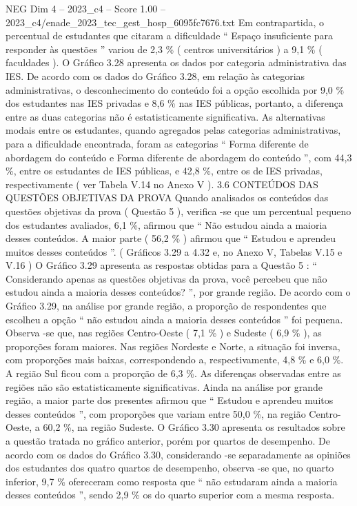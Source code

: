 \begin{textsample}{NEG Dim 4 – 2023\_c4 – Score 1.00 – 2023\_c4/enade\_2023\_tec\_gest\_hosp\_6095fc7676.txt}
Em contrapartida, o percentual de estudantes que citaram a dificuldade “ Espaço insuficiente para responder às questões ” variou de 2,3 \% ( centros universitários ) a 9,1 \% ( faculdades ).
O Gráfico 3.28 apresenta os dados por categoria administrativa das IES.
De acordo com os dados do Gráfico 3.28, em relação às categorias administrativas, o desconhecimento do conteúdo foi a opção escolhida por 9,0 \% dos estudantes nas IES privadas e 8,6 \% nas IES públicas, portanto, a diferença entre as duas categorias não é estatisticamente significativa.
As alternativas modais entre os estudantes, quando agregados pelas categorias administrativas, para a dificuldade encontrada, foram as categorias “ Forma diferente de abordagem do conteúdo e Forma diferente de abordagem do conteúdo ”, com 44,3 \%, entre os estudantes de IES públicas, e 42,8 \%, entre os de IES privadas, respectivamente ( ver Tabela V.14 no Anexo V ). 3.6 CONTEÚDOS DAS QUESTÕES OBJETIVAS DA PROVA Quando analisados os conteúdos das questões objetivas da prova ( Questão 5 ), verifica -se que um percentual pequeno dos estudantes avaliados, 6,1 \%, afirmou que “ Não estudou ainda a maioria desses conteúdos.
A maior parte ( 56,2 \% ) afirmou que “ Estudou e aprendeu muitos desses conteúdos ”. ( Gráficos 3.29 a 4.32 e, no Anexo V, Tabelas V.15 e V.16 ) O Gráfico 3.29 apresenta as respostas obtidas para a Questão 5 : “ Considerando apenas as questões objetivas da prova, você percebeu que não estudou ainda a maioria desses conteúdos? ”, por grande região.
De acordo com o Gráfico 3.29, na análise por grande região, a proporção de respondentes que escolheu a opção “ não estudou ainda a maioria desses conteúdos ” foi pequena.
Observa -se que, nas regiões Centro-Oeste ( 7,1 \% ) e Sudeste ( 6,9 \% ), as proporções foram maiores.
Nas regiões Nordeste e Norte, a situação foi inversa, com proporções mais baixas, correspondendo a, respectivamente, 4,8 \% e 6,0 \%.
A região Sul ficou com a proporção de 6,3 \%.
As diferenças observadas entre as regiões não são estatisticamente significativas.
Ainda na análise por grande região, a maior parte dos presentes afirmou que “ Estudou e aprendeu muitos desses conteúdos ”, com proporções que variam entre 50,0 \%, na região Centro-Oeste, a 60,2 \%, na região Sudeste.
O Gráfico 3.30 apresenta os resultados sobre a questão tratada no gráfico anterior, porém por quartos de desempenho.
De acordo com os dados do Gráfico 3.30, considerando -se separadamente as opiniões dos estudantes dos quatro quartos de desempenho, observa -se que, no quarto inferior, 9,7 \% ofereceram como resposta que “ não estudaram ainda a maioria desses conteúdos ”, sendo 2,9 \% os do quarto superior com a mesma resposta.

\end{textsample}
